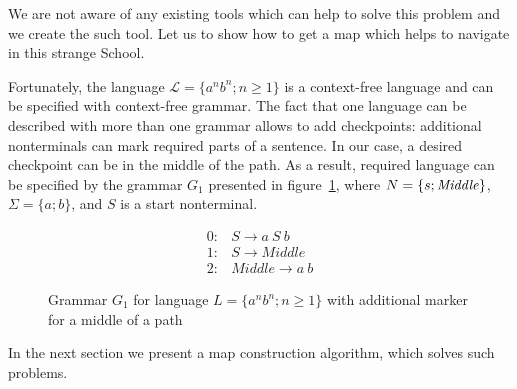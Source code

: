 We are not aware of any existing tools which can help to solve this problem and we create the such tool.
Let us to show how to get a map which helps to navigate in this strange School.

Fortunately, the language $\mathcal{L} = \{a^n b^n; n \geq 1\}$ is a context-free language and can be specified with context-free grammar. 
The fact that one language can be described with more than one grammar allows to add checkpoints: additional nonterminals can mark required parts of a sentence.
In our case, a desired checkpoint can be in the middle of the path.
As a result, required language can be specified by the grammar $G_1$ presented in figure~\ref{grammarG}, where $N = \{s; \text{\textit{Middle}}\}$, $\Sigma = \{a; b\}$, and $S$ is a start nonterminal.

\begin{figure}[h]
   \begin{center}
   \[
\begin{array}{rl}
   0:& S \rightarrow a \ S \ b \\
   1:& S \rightarrow Middle \\
   2:& Middle \rightarrow a \ b
\end{array}
\]

   \caption{Grammar $G_1$ for language $L=\{a^n b^n; n \geq 1\}$ with additional marker for a middle of a path}
   \label{grammarG}        
   \end{center}
\end{figure}

In the next section we present a map construction algorithm,  which solves such problems.
